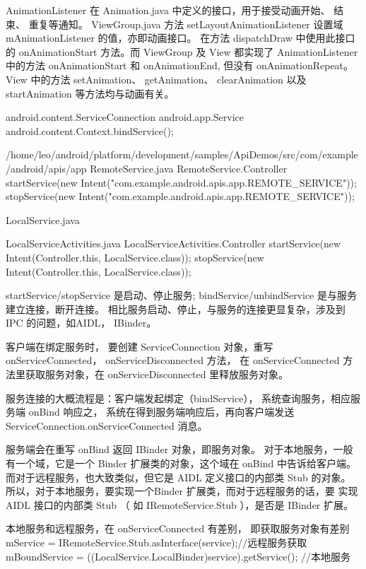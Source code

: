 \documentclass{book}
\begin{document}
\begin{CJK}{UTF8}{gbsn}
AnimationListener 在 Animation.java 中定义的接口，用于接受动画开始、 结束、 重复等通知。
ViewGroup.java 方法 setLayoutAnimationListener 设置域 mAnimationListener
的值，亦即动画接口。 在方法 dispatchDraw 中使用此接口的 onAnimationStart
方法。而 ViewGroup 及 View 都实现了 AnimationListener 中的方法
onAnimationStart 和 onAnimationEnd, 但没有 onAnimationRepeat。 View 中的方法
setAnimation、 getAnimation、 clearAnimation 以及 startAnimation
等方法均与动画有关。



android.content.ServiceConnection
android.app.Service
android.content.Context.bindService();

/home/leo/android/platform/development/samples/ApiDemos/src/com/example/android/apis/app
RemoteService.java  
RemoteService.Controller
startService(new Intent("com.example.android.apis.app.REMOTE_SERVICE"));
stopService(new Intent("com.example.android.apis.app.REMOTE_SERVICE"));

LocalService.java 

LocalServiceActivities.java
LocalServiceActivities.Controller
   startService(new Intent(Controller.this, LocalService.class));
   stopService(new Intent(Controller.this, LocalService.class));


startService/stopService 是启动、停止服务;
bindService/unbindService 是与服务建立连接，断开连接。
相比服务启动、停止，与服务的连接更显复杂，涉及到 IPC 的问题，如AIDL， IBinder。 

客户端在绑定服务时， 要创建 ServiceConnection 对象，重写 onServiceConnected，
onServiceDisconnected 方法， 在 onServiceConnected 方法里获取服务对象，在
onServiceDisconnected 里释放服务对象。



服务连接的大概流程是：客户端发起绑定（bindService）， 系统查询服务，相应服务端 onBind 响应之，
系统在得到服务端响应后，再向客户端发送 ServiceConnection.onServiceConnected 消息。

服务端会在重写 onBind 返回 IBinder 对象，即服务对象。
对于本地服务，一般有一个域，它是一个 Binder 扩展类的对象，这个域在 onBind
中告诉给客户端。
而对于远程服务，也大致类似，但它是 AIDL 定义接口的内部类 Stub 的对象。
所以，对于本地服务，要实现一个Binder 扩展类，而对于远程服务的话，要 实现 AIDL
接口的内部类 Stub （ 如 IRemoteService.Stub ），是否是 IBinder 扩展。

本地服务和远程服务，在 onServiceConnected 有差别， 即获取服务对象有差别 
mService = IRemoteService.Stub.asInterface(service);//远程服务获取
mBoundService = ((LocalService.LocalBinder)service).getService();  //本地服务


\end{CJK}
\end{document}
